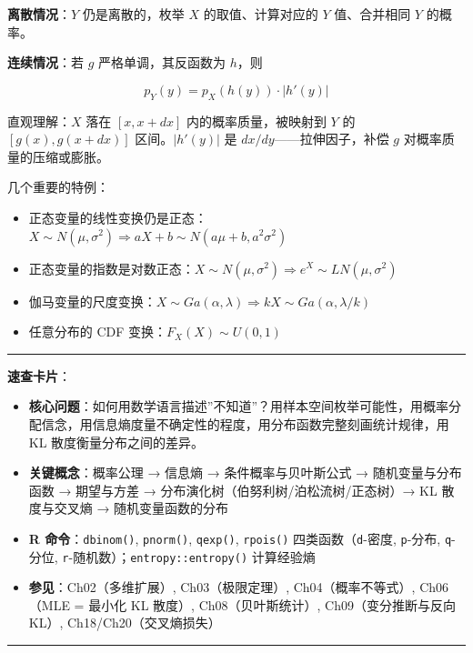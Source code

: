 \documentclass[
]{book}
\providecommand{\tightlist}{%
  \setlength{\itemsep}{0pt}\setlength{\parskip}{0pt}}
\begin{document}
\textbf{离散情况}：\(Y\) 仍是离散的，枚举 \(X\) 的取值、计算对应的 \(Y\) 值、合并相同 \(Y\) 的概率。

\textbf{连续情况}：若 \(g\) 严格单调，其反函数为 \(h\)，则

\[p_Y(y) = p_X(h(y)) \cdot |h'(y)|\]

直观理解：\(X\) 落在 \([x, x+dx]\) 内的概率质量，被映射到 \(Y\) 的 \([g(x), g(x+dx)]\) 区间。\(|h'(y)|\) 是 \(dx/dy\)------拉伸因子，补偿 \(g\) 对概率质量的压缩或膨胀。

几个重要的特例：

\begin{itemize}
\tightlist
\item
  正态变量的线性变换仍是正态：\(X \sim N(\mu,\sigma^2) \Rightarrow aX+b \sim N(a\mu+b, a^2\sigma^2)\)
\item
  正态变量的指数是对数正态：\(X \sim N(\mu,\sigma^2) \Rightarrow e^X \sim LN(\mu,\sigma^2)\)
\item
  伽马变量的尺度变换：\(X \sim Ga(\alpha,\lambda) \Rightarrow kX \sim Ga(\alpha, \lambda/k)\)
\item
  任意分布的 CDF 变换：\(F_X(X) \sim U(0,1)\)
\end{itemize}

\begin{center}\rule{0.5\linewidth}{0.5pt}\end{center}

\textbf{速查卡片}：

\begin{itemize}
\tightlist
\item
  \textbf{核心问题}：如何用数学语言描述''不知道''？用样本空间枚举可能性，用概率分配信念，用信息熵度量不确定性的程度，用分布函数完整刻画统计规律，用 KL 散度衡量分布之间的差异。
\item
  \textbf{关键概念}：概率公理 → 信息熵 → 条件概率与贝叶斯公式 → 随机变量与分布函数 → 期望与方差 → 分布演化树（伯努利树/泊松流树/正态树）→ KL 散度与交叉熵 → 随机变量函数的分布
\item
  \textbf{R 命令}：\texttt{dbinom()}, \texttt{pnorm()}, \texttt{qexp()}, \texttt{rpois()} 四类函数（\texttt{d}-密度, \texttt{p}-分布, \texttt{q}-分位, \texttt{r}-随机数）；\texttt{entropy::entropy()} 计算经验熵
\item
  \textbf{参见}：Ch02（多维扩展）, Ch03（极限定理）, Ch04（概率不等式）, Ch06（MLE = 最小化 KL 散度）, Ch08（贝叶斯统计）, Ch09（变分推断与反向 KL）, Ch18/Ch20（交叉熵损失）
\end{itemize}

\begin{center}\rule{0.5\linewidth}{0.5pt}\end{center}
\end{document}
